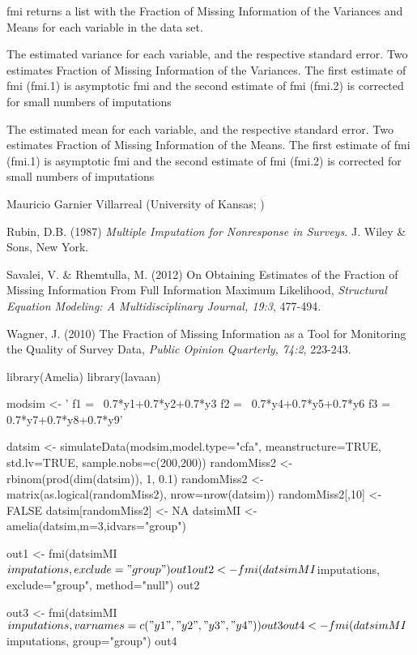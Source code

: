 \documentclass[a4paper]{book}
\begin{document}
\begin{Value}
fmi returns a list with the Fraction of Missing Information of the Variances and Means for each variable in the data set.
\begin{ldescription}
\item[\code{Variances}] The estimated variance for each variable, and the respective standard error.
Two estimates Fraction of Missing Information of the Variances. The first estimate of fmi (fmi.1) is asymptotic fmi and the second estimate of fmi (fmi.2) is corrected for small numbers of imputations
\item[\code{Means}] The estimated mean for each variable, and the respective standard error.
Two estimates Fraction of Missing Information of the Means. The first estimate of fmi (fmi.1) is asymptotic fmi and the second estimate of fmi (fmi.2) is corrected for small numbers of imputations
\end{ldescription}
\end{Value}
%
\begin{Author}\relax
Mauricio Garnier Villarreal (University of Kansas; )
\end{Author}
%
\begin{References}\relax
Rubin, D.B. (1987) \emph{Multiple Imputation for Nonresponse in Surveys.} J. Wiley \& Sons, New York.

Savalei, V. \& Rhemtulla, M. (2012) On Obtaining Estimates of the Fraction
of Missing Information From Full Information Maximum Likelihood, \emph{Structural Equation Modeling: A Multidisciplinary Journal, 19:3}, 477-494.

Wagner, J. (2010) The Fraction of Missing Information as a Tool for Monitoring the Quality of Survey Data, \emph{Public Opinion Quarterly, 74:2}, 223-243.
\end{References}
%
\begin{Examples}
\begin{ExampleCode}
library(Amelia)
library(lavaan)

modsim <- '
f1 =~ 0.7*y1+0.7*y2+0.7*y3
f2 =~ 0.7*y4+0.7*y5+0.7*y6
f3 =~ 0.7*y7+0.7*y8+0.7*y9'

datsim <- simulateData(modsim,model.type="cfa", meanstructure=TRUE, 
                       std.lv=TRUE, sample.nobs=c(200,200))
randomMiss2 <- rbinom(prod(dim(datsim)), 1, 0.1)
randomMiss2 <- matrix(as.logical(randomMiss2), nrow=nrow(datsim))
randomMiss2[,10] <- FALSE
datsim[randomMiss2] <- NA
datsimMI <- amelia(datsim,m=3,idvars="group")

out1 <- fmi(datsimMI$imputations, exclude="group")
out1
                       
out2 <- fmi(datsimMI$imputations, exclude="group", method="null")
out2
                       
out3 <- fmi(datsimMI$imputations, varnames=c("y1","y2","y3","y4"))
out3

out4 <- fmi(datsimMI$imputations, group="group")
out4

\end{ExampleCode}
\end{Examples}
\end{document}
